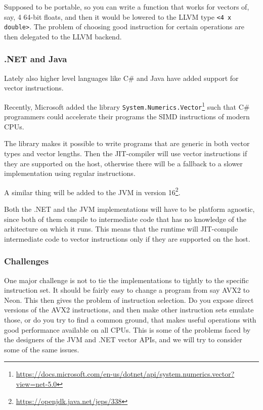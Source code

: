 \documentclass{article}
\begin{document}
Supposed to be portable, so you can write a function that works for vectors of, say, 4 64-bit floats, and then it would be lowered to the LLVM type \verb!<4 x double>!. The problem of choosing good instruction for certain operations are then delegated to the LLVM backend.

\subsubsection{.NET and Java}

Lately also higher level languages like C\# and Java have added support for vector instructions.

Recently, Microsoft added the library \verb!System.Numerics.Vector!\footnote{\url{https://docs.microsoft.com/en-us/dotnet/api/system.numerics.vector?view=net-5.0}} such that C\# programmers could accelerate their programs the SIMD instructions of modern CPUs.

The library makes it possible to write programs that are generic in both vector types and vector lengths. Then the JIT-compiler will use vector instructions if they are supported on the host, otherwise there will be a fallback to a slower implementation using regular instructions.

A similar thing will be added to the JVM in version 16\footnote{\url{https://openjdk.java.net/jeps/338}}.

Both the .NET and the JVM implementations will have to be platform agnostic, since both of them compile to intermediate code that has no knowledge of the arhitecture on which it runs. This means that the runtime will JIT-compile intermediate code to vector instructions only if they are supported on the host.

\subsubsection{Challenges}

One major challenge is not to tie the implementations to tightly to the specific instruction set. It should be fairly easy to change a program from say AVX2 to Neon. This then gives the problem of instruction selection. Do you expose direct versions of the AVX2 instructions, and then make other instruction sets emulate those, or do you try to find a common ground, that makes useful operations with good performance available on all CPUs. This is some of the problems faced by the designers of the JVM and .NET vector APIs, and we will try to consider some of the same issues.
\end{document}
